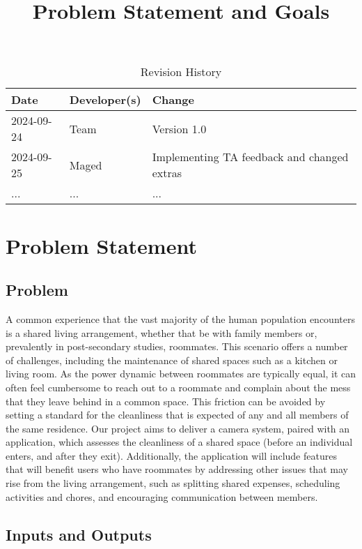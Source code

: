 \documentclass{article}
\title{Problem Statement and Goals\\\progname}
\author{\authname}
\date{}
\begin{document}
\maketitle

\begin{table}[hp]
\caption{Revision History} \label{TblRevisionHistory}
\begin{tabularx}{\textwidth}{llX}
\toprule
\textbf{Date} & \textbf{Developer(s)} & \textbf{Change}\\
\midrule
2024-09-24 & Team & Version 1.0 \\
2024-09-25 & Maged & Implementing TA feedback and changed extras\\
... & ... & ...\\
\bottomrule
\end{tabularx}
\end{table}

\section{Problem Statement}
\subsection{Problem}
A common experience that the vast majority of the human population encounters is a
shared living arrangement, whether that be with family members or, prevalently in
post-secondary studies, roommates. This scenario offers a number of challenges, including the
maintenance of shared spaces such as a kitchen or living room. As the power dynamic between
roommates are typically equal, it can often feel cumbersome to reach out to a roommate and
complain about the mess that they leave behind in a common space. This friction can be
avoided by setting a standard for the cleanliness that is expected of any and all members of the
same residence. Our project aims to deliver a camera system, paired with an application, which
assesses the cleanliness of a shared space (before an individual enters, and after they exit).
Additionally, the application will include features that will benefit users who have roommates by
addressing other issues that may rise from the living arrangement, such as splitting shared
expenses, scheduling activities and chores, and encouraging communication between
members.

\subsection{Inputs and Outputs}
\end{document}
